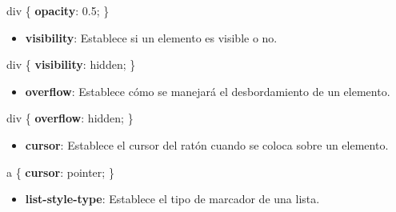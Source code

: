 \documentclass[
  a4paper,
  DIV=11,
  numbers=noendperiod,
  onepage,
  openany]{scrreprt}
\newenvironment{Shaded}{\begin{snugshade}}{\end{snugshade}}
\newcommand{\CharTok}[1]{\textcolor[rgb]{0.13,0.47,0.30}{#1}}
\newcommand{\DecValTok}[1]{\textcolor[rgb]{0.68,0.00,0.00}{#1}}
\newcommand{\KeywordTok}[1]{\textcolor[rgb]{0.00,0.23,0.31}{\textbf{#1}}}
\newcommand{\NormalTok}[1]{\textcolor[rgb]{0.00,0.23,0.31}{#1}}
\newcommand{\OperatorTok}[1]{\textcolor[rgb]{0.37,0.37,0.37}{#1}}
\providecommand{\tightlist}{%
  \setlength{\itemsep}{0pt}\setlength{\parskip}{0pt}}\usepackage{longtable,booktabs,array}
\begin{document}
\begin{tcolorbox}
\begin{Shaded}
\begin{Highlighting}[]
\NormalTok{div \{}
  \KeywordTok{opacity}\CharTok{:} \DecValTok{0.5}\OperatorTok{;}
\NormalTok{\}}
\end{Highlighting}
\end{Shaded}

\begin{itemize}
\tightlist
\item
  \textbf{visibility}: Establece si un elemento es visible o no.
\end{itemize}

\begin{Shaded}
\begin{Highlighting}[]
\NormalTok{div \{}
  \KeywordTok{visibility}\CharTok{:} \DecValTok{hidden}\OperatorTok{;}
\NormalTok{\}}
\end{Highlighting}
\end{Shaded}

\begin{itemize}
\tightlist
\item
  \textbf{overflow}: Establece cómo se manejará el desbordamiento de un
  elemento.
\end{itemize}

\begin{Shaded}
\begin{Highlighting}[]
\NormalTok{div \{}
  \KeywordTok{overflow}\CharTok{:} \DecValTok{hidden}\OperatorTok{;}
\NormalTok{\}}
\end{Highlighting}
\end{Shaded}

\begin{itemize}
\tightlist
\item
  \textbf{cursor}: Establece el cursor del ratón cuando se coloca sobre
  un elemento.
\end{itemize}

\begin{Shaded}
\begin{Highlighting}[]
\NormalTok{a \{}
  \KeywordTok{cursor}\CharTok{:} \DecValTok{pointer}\OperatorTok{;}
\NormalTok{\}}
\end{Highlighting}
\end{Shaded}

\begin{itemize}
\tightlist
\item
  \textbf{list-style-type}: Establece el tipo de marcador de una lista.
\end{itemize}


\end{tcolorbox}
\end{document}
